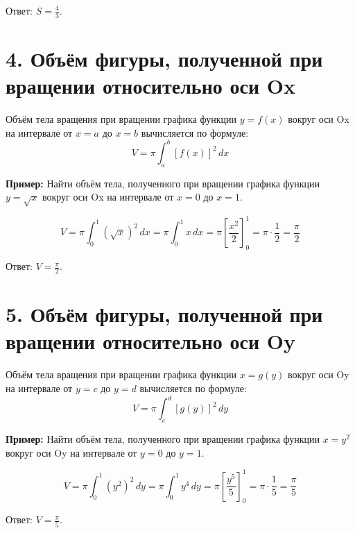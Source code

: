 \documentclass{article}
\begin{document}
Ответ: \( S = \frac{4}{3} \).

\section*{4. Объём фигуры, полученной при вращении относительно оси Ox}
Объём тела вращения при вращении графика функции \( y = f(x) \) вокруг оси Ox на интервале от \( x = a \) до \( x = b \) вычисляется по формуле:
\[
V = \pi \int_{a}^{b} [f(x)]^2 \, dx
\]

\textbf{Пример:} Найти объём тела, полученного при вращении графика функции \( y = \sqrt{x} \) вокруг оси Ox на интервале от \( x = 0 \) до \( x = 1 \).

\[
V = \pi \int_{0}^{1} (\sqrt{x})^2 \, dx = \pi \int_{0}^{1} x \, dx = \pi \left[ \frac{x^2}{2} \right]_{0}^{1} = \pi \cdot \frac{1}{2} = \frac{\pi}{2}
\]

Ответ: \( V = \frac{\pi}{2} \).

\section*{5. Объём фигуры, полученной при вращении относительно оси Oy}
Объём тела вращения при вращении графика функции \( x = g(y) \) вокруг оси Oy на интервале от \( y = c \) до \( y = d \) вычисляется по формуле:
\[
V = \pi \int_{c}^{d} [g(y)]^2 \, dy
\]

\textbf{Пример:} Найти объём тела, полученного при вращении графика функции \( x = y^2 \) вокруг оси Oy на интервале от \( y = 0 \) до \( y = 1 \).

\[
V = \pi \int_{0}^{1} (y^2)^2 \, dy = \pi \int_{0}^{1} y^4 \, dy = \pi \left[ \frac{y^5}{5} \right]_{0}^{1} = \pi \cdot \frac{1}{5} = \frac{\pi}{5}
\]

Ответ: \( V = \frac{\pi}{5} \).
\end{document}
